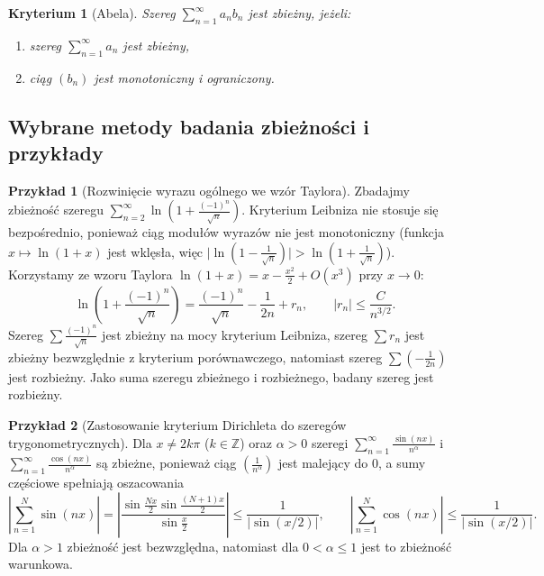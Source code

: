 \documentclass[11pt, a4paper]{article}
\theoremstyle{plain}
\newtheorem*{kryterium}{Kryterium}
\theoremstyle{definition}
\newtheorem*{przyklad}{Przykład}
\begin{document}
\begin{kryterium}[Abela]
Szereg $\sum_{n=1}^\infty a_n b_n$ jest zbieżny, jeżeli:
\begin{enumerate}
    \item szereg $\sum_{n=1}^\infty a_n$ jest zbieżny,
    \item ciąg $(b_n)$ jest monotoniczny i ograniczony.
\end{enumerate}
\end{kryterium}

\subsection{Wybrane metody badania zbieżności i przykłady}

\begin{przyklad}[Rozwinięcie wyrazu ogólnego we wzór Taylora]
Zbadajmy zbieżność szeregu $\sum_{n=2}^\infty \ln\left(1 + \frac{(-1)^n}{\sqrt{n}}\right)$. Kryterium Leibniza nie stosuje się bezpośrednio, ponieważ ciąg modułów wyrazów nie jest monotoniczny (funkcja $x \mapsto \ln(1+x)$ jest wklęsła, więc $\lvert \ln(1 - \frac{1}{\sqrt{n}}) \rvert > \ln(1 + \frac{1}{\sqrt{n}})$). Korzystamy ze wzoru Taylora $\ln(1 + x) = x - \frac{x^2}{2} + O(x^3)$ przy $x \to 0$:
\[
\ln\left(1 + \frac{(-1)^n}{\sqrt{n}}\right) = \frac{(-1)^n}{\sqrt{n}} - \frac{1}{2n} + r_n, \qquad \lvert r_n \rvert \leqslant \frac{C}{n^{3/2}}.
\]
Szereg $\sum \frac{(-1)^n}{\sqrt{n}}$ jest zbieżny na mocy kryterium Leibniza, szereg $\sum r_n$ jest zbieżny bezwzględnie z kryterium porównawczego, natomiast szereg $\sum \left(-\frac{1}{2n}\right)$ jest rozbieżny. Jako suma szeregu zbieżnego i rozbieżnego, badany szereg jest rozbieżny.
\end{przyklad}

\begin{przyklad}[Zastosowanie kryterium Dirichleta do szeregów trygonometrycznych]
Dla $x \neq 2k\pi$ ($k \in \mathbb{Z}$) oraz $\alpha > 0$ szeregi $\sum_{n=1}^\infty \frac{\sin(nx)}{n^\alpha}$ i $\sum_{n=1}^\infty \frac{\cos(nx)}{n^\alpha}$ są zbieżne, ponieważ ciąg $\left(\frac{1}{n^\alpha}\right)$ jest malejący do $0$, a sumy częściowe spełniają oszacowania
\[
\left\lvert \sum_{n=1}^N \sin(nx) \right\rvert = \left\lvert \frac{\sin\frac{Nx}{2}\sin\frac{(N+1)x}{2}}{\sin\frac{x}{2}} \right\rvert \leqslant \frac{1}{\lvert \sin(x/2) \rvert}, \qquad \left\lvert \sum_{n=1}^N \cos(nx) \right\rvert \leqslant \frac{1}{\lvert \sin(x/2) \rvert}.
\]
Dla $\alpha > 1$ zbieżność jest bezwzględna, natomiast dla $0 < \alpha \leqslant 1$ jest to zbieżność warunkowa.
\end{przyklad}
\end{document}
